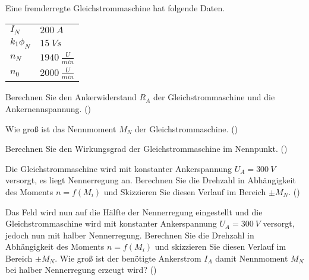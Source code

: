 \begin{question}[section=2,name={18.2.2015},mode=exm,type=bsp,tags={20150218}]
Eine fremderregte Gleichstrommaschine hat folgende Daten.\\
\begin{tabular}{L{2cm}l}
$I_{N}$ \dotfill &$200~A$\\
$k_1 \phi_N$ \dotfill & $15~Vs$ \\
$n_N$ \dotfill & $1940~\frac{U}{min}$\\
$n_0$ \dotfill & $2000~\frac{U}{min}$
\end{tabular}
\begin{compactenum}
\item Berechnen Sie den Ankerwiderstand $R_A$ der Gleichstrommaschine und die Ankernennspannung. ()
\item Wie groß ist das Nennmoment $M_N$ der Gleichstrommaschine. ()
\item Berechnen Sie den Wirkungsgrad der Gleichstrommaschine im Nennpunkt. ()
\item Die Gleichstrommaschine wird mit konstanter Ankerspannung $U_A = 300~V$ versorgt, es liegt Nennerregung an. Berechnen Sie die Drehzahl in Abhängigkeit des Moments $n=f(M_i)$ und Skizzieren Sie diesen Verlauf im Bereich $\pm M_N$. ()
\item Das Feld wird nun auf die Hälfte der Nennerregung eingestellt und die Gleichstrommaschine wird mit konstanter Ankerspannung $U_A = 300~V$ versorgt, jedoch nun mit halber Nennerregung. Berechnen Sie die Drehzahl in Abhängigkeit des Moments $n= f(M_i)$ und skizzieren Sie diesen Verlauf im Bereich $\pm M_N$. Wie groß ist der benötigte Ankerstrom $I_A$ damit Nennmoment $M_N$ bei halber Nennerregung erzeugt wird? ()
\end{compactenum}
\end{question}
